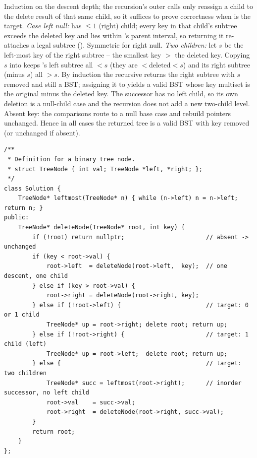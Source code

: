 \begin{proofbox}
Induction on the descent depth; the recursion's outer calls only reassign a child to the delete
result of that same child, so it suffices to prove correctness when  is the target.
\emph{Case left null:}  has $\le 1$ (right) child; every key in that child's subtree
exceeds the deleted key and lies within 's parent interval, so returning it re-attaches a
legal subtree (). Symmetric for right null. \emph{Two children:} let $s$ be the
left-most key of the right subtree -- the smallest key $>$ the deleted key. Copying $s$ into
 keeps 's left subtree all $<s$ (they are $<\text{deleted}<s$) and its right
subtree (minus $s$) all $>s$. By induction the recursive  returns the
right subtree with $s$ removed and still a BST; assigning it to  yields a valid BST
whose key multiset is the original minus the deleted key. The successor has no left child, so its own
deletion is a null-child case and the recursion does not add a new two-child level. Absent key: the
comparisons route to a null base case and rebuild pointers unchanged. Hence in all cases the returned
tree is a valid BST with key removed (or unchanged if absent). \end{proofbox}

\begin{lstlisting}[caption={Delete Node in a BST -- submittable solution with successor splice (LeetCode 450)}, label={lst:c05-delete}]
/**
 * Definition for a binary tree node.
 * struct TreeNode { int val; TreeNode *left, *right; };
 */
class Solution {
    TreeNode* leftmost(TreeNode* n) { while (n->left) n = n->left; return n; }
public:
    TreeNode* deleteNode(TreeNode* root, int key) {
        if (!root) return nullptr;                       // absent -> unchanged
        if (key < root->val) {
            root->left  = deleteNode(root->left,  key);  // one descent, one child
        } else if (key > root->val) {
            root->right = deleteNode(root->right, key);
        } else if (!root->left) {                        // target: 0 or 1 child
            TreeNode* up = root->right; delete root; return up;
        } else if (!root->right) {                       // target: 1 child (left)
            TreeNode* up = root->left;  delete root; return up;
        } else {                                         // target: two children
            TreeNode* succ = leftmost(root->right);      // inorder successor, no left child
            root->val    = succ->val;
            root->right  = deleteNode(root->right, succ->val);
        }
        return root;
    }
};
\end{lstlisting}

